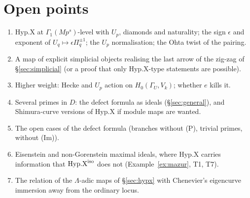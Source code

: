 \documentclass[11pt]{amsart}
\theoremstyle{plain}
\theoremstyle{definition}
\theoremstyle{remark}
\begin{document}
\section{Open points}\label{sec:open}
\begin{enumerate}[label=O\arabic*.]
\item $\mathrm{Hyp.X}$ at $\Gamma_1(Mp^s)$-level with $U_p$, diamonds and naturality; the sign $\epsilon$ and exponent of $U_q\mapsto\epsilon\Pi_q^{\pm1}$; the $U_p$ normalisation; the Ohta twist of the pairing.
\item A map of explicit simplicial objects realising the last arrow of the zig-zag of \S\ref{sec:simplicial} (or a proof that only $\mathrm{Hyp.X}$-type statements are possible).
\item Higher weight: Hecke and $U_p$ action on $H_0(\Gamma_U,V_k)$; whether $e$ kills it.
\item Several primes in $D$: the defect formula as ideals (\S\ref{sec:general}), and Shimura-curve versions of $\mathrm{Hyp.X}$ if module maps are wanted.
\item The open cases of the defect formula (branches without (P), trivial primes, without (Im)).
\item Eisenstein and non-Gorenstein maximal ideals, where $\mathrm{Hyp.X}$ carries information that $\mathrm{Hyp.X}^{\rm iso}$ does not (Example~\ref{ex:mazur}, T1, T7).
\item The relation of the $\Lambda$-adic maps of \S\ref{sec:hypx} with Chenevier's eigencurve immersion away from the ordinary locus.
\end{enumerate}
\end{document}
